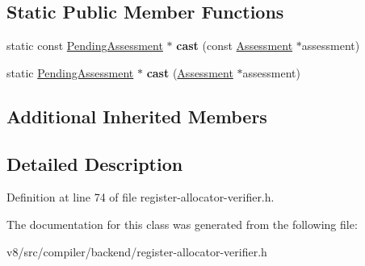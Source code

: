 \subsection*{Static Public Member Functions}
\begin{DoxyCompactItemize}
\item 
\mbox{\label{classv8_1_1internal_1_1compiler_1_1PendingAssessment_ad87b5674863107086a5f071587838ad7}} 
static const \mbox{\hyperlink{classv8_1_1internal_1_1compiler_1_1PendingAssessment}{Pending\+Assessment}} $\ast$ {\bfseries cast} (const \mbox{\hyperlink{classv8_1_1internal_1_1compiler_1_1Assessment}{Assessment}} $\ast$assessment)
\item 
\mbox{\label{classv8_1_1internal_1_1compiler_1_1PendingAssessment_af4bfcb68aef834a1e1d5248a927d5619}} 
static \mbox{\hyperlink{classv8_1_1internal_1_1compiler_1_1PendingAssessment}{Pending\+Assessment}} $\ast$ {\bfseries cast} (\mbox{\hyperlink{classv8_1_1internal_1_1compiler_1_1Assessment}{Assessment}} $\ast$assessment)
\end{DoxyCompactItemize}
\subsection*{Additional Inherited Members}


\subsection{Detailed Description}


Definition at line 74 of file register-\/allocator-\/verifier.\+h.



The documentation for this class was generated from the following file\+:\begin{DoxyCompactItemize}
\item 
v8/src/compiler/backend/register-\/allocator-\/verifier.\+h\end{DoxyCompactItemize}
